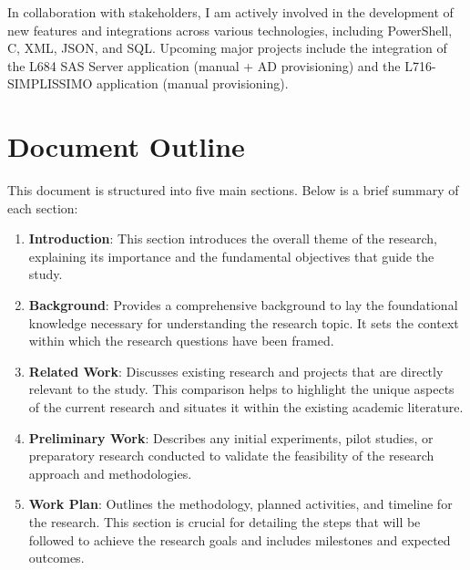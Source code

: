 In collaboration with stakeholders, I am actively involved in the development of new features and integrations across various technologies, including PowerShell, C, XML, JSON, and SQL. Upcoming major projects include the integration of the L684 SAS Server application (manual + AD provisioning) and the L716-SIMPLISSIMO application (manual provisioning).

\section{Document Outline}

This document is structured into five main sections. Below is a brief summary of each section:

\begin{enumerate}
    \item \textbf{Introduction}: This section introduces the overall theme of the research, explaining its importance and the fundamental objectives that guide the study.
    
    \item \textbf{Background}: Provides a comprehensive background to lay the foundational knowledge necessary for understanding the research topic. It sets the context within which the research questions have been framed.
    
    \item \textbf{Related Work}: Discusses existing research and projects that are directly relevant to the study. This comparison helps to highlight the unique aspects of the current research and situates it within the existing academic literature.
    
    \item \textbf{Preliminary Work}: Describes any initial experiments, pilot studies, or preparatory research conducted to validate the feasibility of the research approach and methodologies.
    
    \item \textbf{Work Plan}: Outlines the methodology, planned activities, and timeline for the research. This section is crucial for detailing the steps that will be followed to achieve the research goals and includes milestones and expected outcomes.
\end{enumerate}
